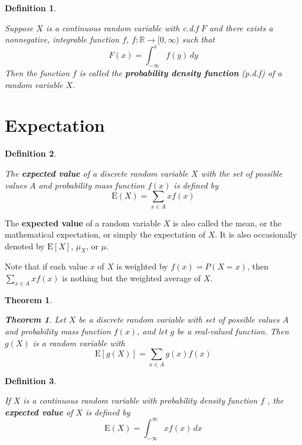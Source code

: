 \documentclass[
]{book}
\newtheorem{theorem}{Theorem}[chapter]
\theoremstyle{definition}
\newtheorem{definition}{Definition}[chapter]
\theoremstyle{definition}
\theoremstyle{definition}
\theoremstyle{definition}
\theoremstyle{remark}
\begin{document}
\begin{definition}
\protect\hypertarget{def:unlabeled-div-4}{}\label{def:unlabeled-div-4}

\emph{Suppose \(X\) is a continuous random variable with
c.d.f \(F\) and there exists a nonnegative, integrable function \(f\),
\(f: \mathbb{R} \rightarrow [0, \infty)\) such that
\[F(x) = \int_{-\infty}^x f(y)\, dy\] Then the function \(f\) is called
the \textbf{probability density function} (p.d.f) of a random variable \(X\).}

\end{definition}

\hypertarget{expectation}{%
\section{Expectation}\label{expectation}}

\begin{definition}
\protect\hypertarget{def:unlabeled-div-5}{}\label{def:unlabeled-div-5}

\emph{The \textbf{expected value} of a discrete random variable
\(X\) with the set of possible values \(A\) and probability mass function
\(f(x)\) is defined by \[\mathrm{E}(X) = \sum_{x \in A} x f(x)\]}

\end{definition}

The \textbf{expected value} of a random variable \(X\) is also called the mean,
or the mathematical expectation, or simply the expectation of \(X\). It is
also occasionally denoted by \(\mathrm{E}[X]\), \(\mu_X\), or \(\mu\).

Note that if each value \(x\) of \(X\) is weighted by \(f(x) = P(X = x)\),
then \(\displaystyle \sum_{x \in A} x f(x)\) is nothing but the weighted
average of \(X\).

\begin{theorem}
\protect\hypertarget{thm:unlabeled-div-6}{}\label{thm:unlabeled-div-6}

\textbf{Theorem 1}. \emph{Let \(X\) be a discrete random variable with set of
possible values \(A\) and probability mass function \(f(x)\), and let \(g\) be
a real-valued function. Then \(g(X)\) is a random variable with
\[\mathrm{E}[g(X)] = \sum_{x \in A} g(x) f(x)\] }

\end{theorem}

\begin{definition}
\protect\hypertarget{def:unlabeled-div-7}{}\label{def:unlabeled-div-7}

\emph{If \(X\) is a continuous random variable with
probability density function \(f\) , the \textbf{expected value} of \(X\) is
defined by \[\mathrm{E}(X) = \int_{-\infty}^\infty x f(x)\, dx\] }

\end{definition}
\end{document}
